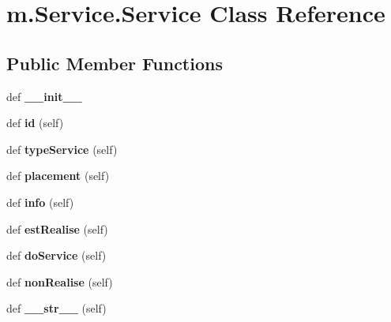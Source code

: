 \hypertarget{classm_1_1_service_1_1_service}{}\section{m.\+Service.\+Service Class Reference}
\label{classm_1_1_service_1_1_service}
\subsection*{Public Member Functions}
\begin{DoxyCompactItemize}
\item 
\hypertarget{classm_1_1_service_1_1_service_aeae3cbda30ee5598d2f2522f2dd3762b}{}def {\bfseries \+\_\+\+\_\+init\+\_\+\+\_\+}\label{classm_1_1_service_1_1_service_aeae3cbda30ee5598d2f2522f2dd3762b}

\item 
\hypertarget{classm_1_1_service_1_1_service_ac7d3b489cdb67c020a06b598ce09657f}{}def {\bfseries id} (self)\label{classm_1_1_service_1_1_service_ac7d3b489cdb67c020a06b598ce09657f}

\item 
\hypertarget{classm_1_1_service_1_1_service_a15e67e7eba7576f9d50fa09103faf688}{}def {\bfseries type\+Service} (self)\label{classm_1_1_service_1_1_service_a15e67e7eba7576f9d50fa09103faf688}

\item 
\hypertarget{classm_1_1_service_1_1_service_a2447db7563acca53386b6789df024e7e}{}def {\bfseries placement} (self)\label{classm_1_1_service_1_1_service_a2447db7563acca53386b6789df024e7e}

\item 
\hypertarget{classm_1_1_service_1_1_service_af5b6456d4f4c86df2904b5931b3bb6f2}{}def {\bfseries info} (self)\label{classm_1_1_service_1_1_service_af5b6456d4f4c86df2904b5931b3bb6f2}

\item 
\hypertarget{classm_1_1_service_1_1_service_ae38dc2758aefe6d8514bf725aaf8c995}{}def {\bfseries est\+Realise} (self)\label{classm_1_1_service_1_1_service_ae38dc2758aefe6d8514bf725aaf8c995}

\item 
\hypertarget{classm_1_1_service_1_1_service_ad56f49faadda86ed1dd79d64217969e4}{}def {\bfseries do\+Service} (self)\label{classm_1_1_service_1_1_service_ad56f49faadda86ed1dd79d64217969e4}

\item 
\hypertarget{classm_1_1_service_1_1_service_af7639c607fca678b51f81b4f46194db0}{}def {\bfseries non\+Realise} (self)\label{classm_1_1_service_1_1_service_af7639c607fca678b51f81b4f46194db0}

\item 
\hypertarget{classm_1_1_service_1_1_service_adfb8340597057a294d3e2e5a0a493d2b}{}def {\bfseries \+\_\+\+\_\+str\+\_\+\+\_\+} (self)\label{classm_1_1_service_1_1_service_adfb8340597057a294d3e2e5a0a493d2b}

\end{DoxyCompactItemize}
